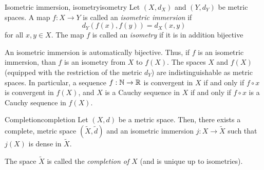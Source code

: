 \documentclass[language=english]{../../Template/TemplateLecture}
\begin{document}
\begin{defi}{Isometric immersion, isometry}{isometry}
    Let $(X, d_X)$ and $(Y, d_Y)$ be metric spaces. A map $f: X \to Y$ is called an \emph{isometric immersion} if 
    \begin{equation}
        d_Y(f(x),f(y)) = d_X(x,y)
    \end{equation}
    for all $x, y \in X$. The map $f$ is called an \emph{isometry} if it is in addition bijective
\end{defi}

\begin{bemerkung}
    An isometric immersion is automatically bijective. Thus, if $f$ is an isometric immersion, than $f$ is an isometry from $X$ to $f(X)$. The spaces $X$ and $f(X)$ (equipped with the restriction of the metric $d_Y$) are indistinguishable as metric spaces. In particular, a sequence $f: \mathbb{N} \to \mathbb{R}$ is convergent in $X$ if and only if $f \circ x$ is convergent in $f(X)$, and $X$ is a Cauchy sequence in $X$ if and only if $f \circ x$ is a Cauchy sequence in $f(X)$.
\end{bemerkung}

\begin{thm}{Completion}{completion}
    Let $(X,d)$ be a metric space. Then, there exists a complete, metric space $(\tilde{X}, \tilde{d})$ and an isometric immersion $j: X \to \tilde{X}$ such that $j(X)$ is dense in $\tilde{X}$.
\end{thm}
The space $\tilde{X}$ is called the \emph{completion of $X$} (and is unique up to isometries).
\end{document}
